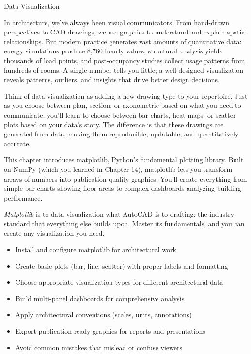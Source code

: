 
\h{Data Visualization}

In architecture, we've always been visual communicators. From hand-drawn perspectives to CAD drawings, we use graphics to understand and explain spatial relationships. But modern practice generates vast amounts of quantitative data: energy simulations produce 8,760 hourly values, structural analysis yields thousands of load points, and post-occupancy studies collect usage patterns from hundreds of rooms. A single number tells you little; a well-designed visualization reveals patterns, outliers, and insights that drive better design decisions.

Think of data visualization as adding a new drawing type to your repertoire. Just as you choose between plan, section, or axonometric based on what you need to communicate, you'll learn to choose between bar charts, heat maps, or scatter plots based on your data's story. The difference is that these drawings are generated from data, making them reproducible, updatable, and quantitatively accurate.

This chapter introduces matplotlib, Python's fundamental plotting library. Built on NumPy (which you learned in Chapter 14), matplotlib lets you transform arrays of numbers into publication-quality graphics. You'll create everything from simple bar charts showing floor areas to complex dashboards analyzing building performance.

\begin{NoteBox}
\emph{Matplotlib} is to data visualization what AutoCAD is to drafting: the industry standard that everything else builds upon. Master its fundamentals, and you can create any visualization you need.
\end{NoteBox}

\begin{tcolorbox}[
    title=Focus of this chapter:,
    colframe=orange,
    colback = white,
    arc=2mm
]
\begin{itemize}
  \item Install and configure matplotlib for architectural work
  \item Create basic plots (bar, line, scatter) with proper labels and formatting
  \item Choose appropriate visualization types for different architectural data
  \item Build multi-panel dashboards for comprehensive analysis
  \item Apply architectural conventions (scales, units, annotations)
  \item Export publication-ready graphics for reports and presentations
  \item Avoid common mistakes that mislead or confuse viewers
\end{itemize}
\end{tcolorbox}

